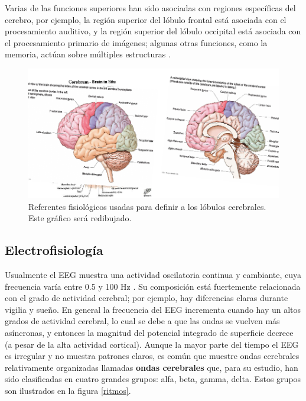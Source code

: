 Varias de las funciones superiores han sido asociadas con regiones específicas del cerebro, por
ejemplo, la región superior del lóbulo frontal está asociada con el procesamiento auditivo, y la
región superior del lóbulo occipital está asociada con el procesamiento primario de imágenes;
algunas otras funciones, como la memoria, actúan sobre múltiples estructuras \cite{Clark98}.

\begin{figure}
\centering
\includegraphics[width=0.8\linewidth]{./img_diagramas/cerebro_zonas.pdf} 
\caption{Referentes fisiológicos usadas para definir a los lóbulos cerebrales. 
Este gráfico será redibujado.
}
\label{lobulos}
\end{figure}


\subsection{Electrofisiología}

Usualmente el EEG muestra una actividad oscilatoria continua y cambiante, cuya 
frecuencia varía entre 0.5 y 100 Hz \cite{Clark98}.
Su composición está fuertemente relacionada con el grado de actividad 
cerebral; por ejemplo, hay diferencias claras durante vigilia y sueño.
En general la frecuencia del EEG incrementa cuando hay un altos grados de actividad cerebral, lo 
cual se debe a que las ondas se vuelven más asíncronas, y entonces la magnitud del  potencial 
integrado de superficie decrece (a pesar de la alta actividad cortical).
Aunque la mayor parte del tiempo el EEG es irregular y no muestra patrones claros, es común que 
muestre ondas cerebrales relativamente organizadas llamadas \textbf{ondas cerebrales} que, 
para su estudio, han sido clasificadas en 
cuatro grandes grupos: alfa, beta, gamma, delta.
Estos grupos son ilustrados en la figura \ref{ritmos}.

